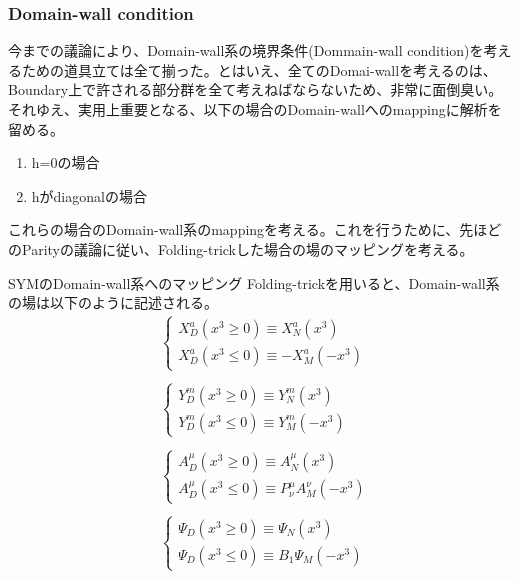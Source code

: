 \documentclass[dvipdfmx,a4paper,10.5pt]{article}
\numberwithin{equation}{section}
\begin{document}
\subsubsection{Domain-wall condition}
今までの議論により、Domain-wall系の境界条件(Dommain-wall condition)を考えるための道具立ては全て揃った。とはいえ、全てのDomai-wallを考えるのは、Boundary上で許される部分群を全て考えねばならないため、非常に面倒臭い。\\
それゆえ、実用上重要となる、以下の場合のDomain-wallへのmappingに解析を留める。
\begin{enumerate}
    \item h=0の場合
    \item hがdiagonalの場合
\end{enumerate}
これらの場合のDomain-wall系のmappingを考える。これを行うために、先ほどのParityの議論に従い、Folding-trickした場合の場のマッピングを考える。
\begin{defbox}{SYMのDomain-wall系へのマッピング}
    Folding-trickを用いると、Domain-wall系の場は以下のように記述される。
    \begin{align*}
        &\begin{cases}
           X_{D}^{a}(x^{3}\geq 0)\equiv X^{a}_{N}(x^{3})\\
           X_{D}^{a}(x^{3}\leq 0)\equiv -X^{a}_{M}(-x^{3})
        \end{cases}\\
        \\
        &\begin{cases}
           Y_{D}^{m}(x^{3}\geq 0)\equiv Y^{m}_{N}(x^{3})\\
           Y_{D}^{m}(x^{3}\leq 0)\equiv Y^{m}_{M}(-x^{3})
        \end{cases}\\
        \\
        &\begin{cases}
           A_{D}^{\mu}(x^{3}\geq 0)\equiv A^{\mu}_{N}(x^{3})\\
           A_{D}^{\mu}(x^{3}\leq 0)\equiv P^{\mu}_{\nu}A^{\nu}_{M}(-x^{3})
        \end{cases}\\
        \\
        &\begin{cases}
           \Psi_{D}(x^{3}\geq 0)\equiv \Psi_{N}(x^{3})\\
           \Psi_{D}(x^{3}\leq 0)\equiv B_{1}\Psi_{M}(-x^{3})
        \end{cases}
    \end{align*}
\end{defbox}
\end{document}
